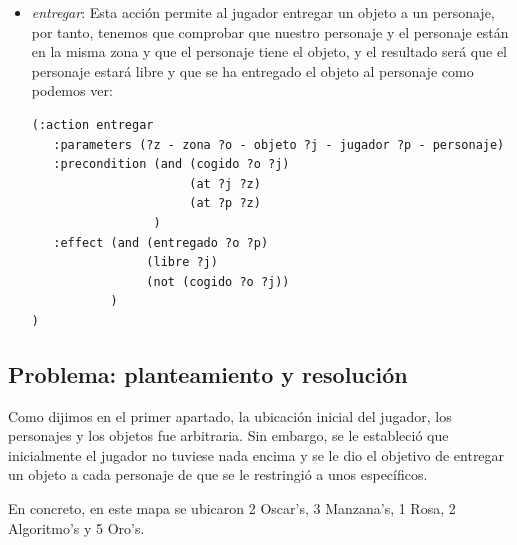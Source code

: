 \documentclass[a4paper, 11pt]{article}
\begin{document}
\begin{itemize}
			\item \textit{entregar}: Esta acción permite al jugador entregar un objeto a un personaje, por
			tanto, tenemos que comprobar que nuestro personaje y el personaje están en la misma zona y que
			el personaje tiene el objeto, y el resultado será que el personaje estará libre y que se ha
			entregado el objeto al personaje como podemos ver:
			\begin{verbatim}
(:action entregar
   :parameters (?z - zona ?o - objeto ?j - jugador ?p - personaje)
   :precondition (and (cogido ?o ?j)
                      (at ?j ?z)
                      (at ?p ?z)
                 )
   :effect (and (entregado ?o ?p)
                (libre ?j)
                (not (cogido ?o ?j))
           )
)
			\end{verbatim}
		\end{itemize}
	
	\subsection{Problema: planteamiento y resolución}
		Como dijimos en el primer apartado, la ubicación inicial del jugador, los personajes y los objetos
		fue arbitraria. Sin embargo, se le estableció que inicialmente el jugador no tuviese nada encima y
		se le dio el objetivo de entregar un objeto a cada personaje de que se le restringió a unos
		específicos.
		
		En concreto, en este mapa se ubicaron 2 Oscar's, 3 Manzana's, 1 Rosa, 2 Algoritmo's y 5 Oro's.
		
\end{document}
